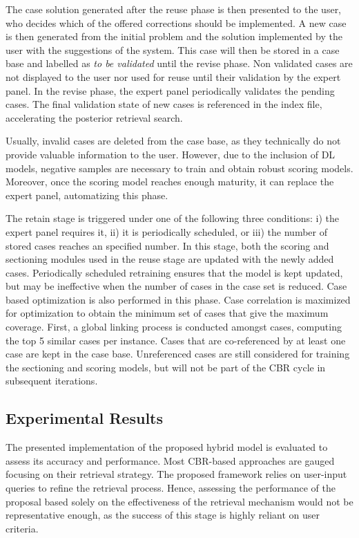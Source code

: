 The case solution generated after the reuse phase is then presented to the user, who decides which of the offered corrections should be implemented. A new case is then generated from the initial problem and the solution implemented by the user with the suggestions of the system. This case will then be stored in a case base and labelled as \textit{to be validated} until the revise phase. Non validated cases are not displayed to the user nor used for reuse until their validation by the expert panel. In the revise phase, the expert panel periodically validates the pending cases. The final validation state of new cases is referenced in the index file, accelerating the posterior retrieval search. 

Usually, invalid cases are deleted from the case base, as they technically do not provide valuable information to the user. However, due to the inclusion of DL models, negative samples are necessary to train and obtain robust scoring models. Moreover, once the scoring model reaches enough maturity, it can replace the expert panel, automatizing this phase. 

The retain stage is triggered under one of the following three conditions: i) the expert panel requires it, ii) it is periodically scheduled, or iii) the number of stored cases reaches an specified number. In this stage, both the scoring and sectioning modules used in the reuse stage are updated with the newly added cases. Periodically scheduled retraining ensures that the model is kept updated, but may be ineffective when the number of cases in the case set is reduced. Case based optimization is also performed in this phase. Case correlation is maximized for optimization to obtain the minimum set of cases that give the maximum coverage. First, a global linking process is conducted amongst cases, computing the top 5 similar cases per instance. Cases that are co-referenced by at least one case are kept in the case base. Unreferenced cases are still considered for training the sectioning and scoring models, but will not be part of the CBR cycle in subsequent iterations.


\subsection{Experimental Results}\label{5_sec:experimental_results}
The presented implementation of the proposed hybrid model is evaluated to assess its accuracy and performance. Most CBR-based approaches are gauged focusing on their retrieval strategy. The proposed framework relies on user-input queries to refine the retrieval process. Hence, assessing the performance of the proposal based solely on the effectiveness of the retrieval mechanism would not be representative enough, as the success of this stage is highly reliant on user criteria.

